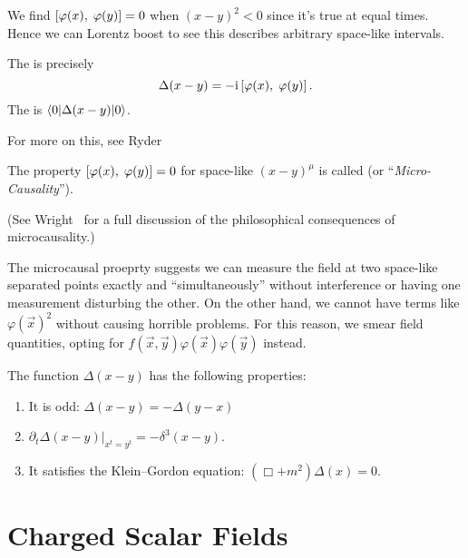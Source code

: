  We find $\left\lbrack\varphi(x),\;\varphi(y)\right\rbrack=0$ when
$(x-y)^{2}<0$ since it's true at equal times. Hence we can Lorentz boost
to see this describes arbitrary space-like intervals.

The 
is precisely 
\begin{equation}
\Delta(x-y) = -{\rm i}\left\lbrack\varphi(x),\;\varphi(y)\right\rbrack.
\end{equation}
The 
is $\braket{0|\Delta(x-y)|0}$.

\begin{rmk}
For more on this, see Ryder~\cite[\S4.2 and \S6.1]{Ryder:1985wq}
\end{rmk}

The property $\left\lbrack\varphi(x),\;\varphi(y)\right\rbrack=0$ for space-like
$(x-y)^{\mu}$ is called 
(or ``\emph{Micro-Causality\/}''). 

(See Wright~\cite{wright2012thesis} for a full discussion of the
philosophical consequences of microcausality.)

The microcausal proeprty suggests we can measure the field at two 
space-like separated points exactly and ``simultaneously'' without 
interference or having one measurement disturbing the other. On 
the other hand, we cannot have terms like $\varphi(\vec{x})^{2}$ 
without causing horrible problems. For this reason, we 
smear 
field quantities, opting for 
$f(\vec{x}, \vec{y})\varphi(\vec{x})\varphi(\vec{y})$ 
instead.

\begin{thm}
The function $\Delta(x-y)$ has the following properties:
\begin{enumerate}
\item It is odd: $\Delta(x-y)=-\Delta(y-x)$
\item $\left.\partial_{t}\Delta(x-y)\right|_{x^{t}=y^{t}} = -\delta^{3}(x-y)$.
\item It satisfies the Klein--Gordon equation: $(\Box + m^{2})\Delta(x)=0$.
\end{enumerate}
\end{thm}

\M


\section{Charged Scalar Fields}

